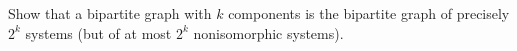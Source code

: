 Show that a bipartite graph with $k$ components is the bipartite graph of precisely $2^k$ systems (but of at most $2^k$ nonisomorphic systems).

